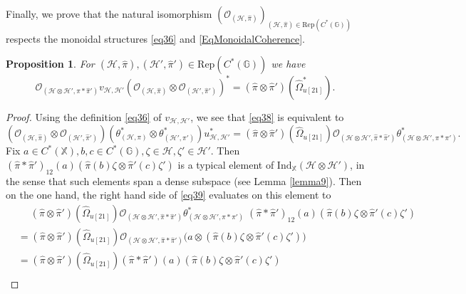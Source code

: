 \documentclass[reqno]{amsart}
\numberwithin{equation}{section}
\newtheorem{Prop}[Theorem]{Proposition}
\newcommand{\G}{\mathbb{G}}
\newcommand{\X}{\mathbb{X}}
\newcommand{\Rep}{\mathrm{Rep}}
\newcommand{\Ind}{\mathrm{Ind}}
\newcommand{\mc}{\mathcal}
\newcommand{\GG}{\mathbb{G}}
\begin{document}
Finally, we prove that the natural isomorphism $(\mc{O}_{(\mc{H},\hat{\pi})})_{(\mc{H},\hat{\pi})\in \Rep(C^*(\G))}$ respects the monoidal structures \eqref{eq36} and \eqref{EqMonoidalCoherence}.

\begin{Prop}\label{prop1}
For $(\mc{H},\hat{\pi}),(\mc{H}',\hat{\pi}')\in \Rep(C^*(\GG))$ we have
\begin{equation}\label{eq38}
\mc{O}_{(\mc{H}\otimes \mc{H}', \hat{\pi}\ast\hat{\pi}')} v_{\mc{H},\mc{H}'}
(\mc{O}_{(\mc{H}, \hat{\pi})}\otimes 
\mc{O}_{( \mc{H}', \hat{\pi}')})^*=
(\hat{\pi}\otimes\hat{\pi}')(\hat{\Omega}^*_{u [21]}).
\end{equation}
\end{Prop}

\begin{proof}
Using the definition \eqref{eq36} of $v_{\mc{H},\mc{H}'}$, we see that \eqref{eq38} is equivalent to
\begin{equation}\label{eq39}
(\mc{O}_{(\mc{H},\hat{\pi})}\otimes \mc{O}_{(\mc{H}',\hat{\pi}')})
( \theta_{(\mc{H},\pi)}^*\otimes \theta_{(\mc{H}',\pi')}^*) u_{\mc{H},\mc{H}'}^*  =
 (\hat{\pi}\otimes \hat{\pi}') (\hat{\Omega}_{u [21]})
 \mc{O}_{(\mc{H}\otimes\mc{H}',\hat{\pi}\ast \hat{\pi}')}
  \theta_{(\mc{H}\otimes \mc{H}',\pi\ast \pi')}^*.
\end{equation}
Fix $a\in C^*(\X),b,c\in C^*(\GG),\zeta\in \mc{H},\zeta'\in \mc{H}'$. Then
$(\hat{\pi}\ast\hat{\pi}')_{12}(a) (\hat{\pi}(b)\zeta \otimes \hat{\pi}'(c) \zeta')$ is a typical element of $\Ind_{\X}(\mc{H}\otimes \mc{H}')$, in the sense that such elements span a dense subspace (see Lemma \ref{lemma9}). Then on the one hand, the right hand side of \eqref{eq39} evaluates on this element to
\begin{equation}\begin{split} \label{eq40}
&\quad\;
 (\hat{\pi}\otimes \hat{\pi}') (\hat{\Omega}_{u [21]})
 \mc{O}_{(\mc{H}\otimes \mc{H}',\hat{\pi}\ast\hat{\pi}')}
  \theta_{(\mc{H}\otimes \mc{H}',\pi\ast \pi')}^*\;
(\hat{\pi}\ast\hat{\pi}')_{12}(a) (\hat{\pi}(b)\zeta \otimes \hat{\pi}'(c) \zeta')\\
&=
 (\hat{\pi}\otimes \hat{\pi}') (\hat{\Omega}_{u [21]})
 \mc{O}_{(\mc{H}\otimes \mc{H}',\hat{\pi}\ast\hat{\pi}')}
\bigl( 
a\otimes (\hat{\pi}(b)\zeta \otimes \hat{\pi}'(c) \zeta')\bigr)\\
&=
(\hat{\pi}\otimes\hat{\pi}')(\hat{\Omega}_{u[21]})
(\hat{\pi}\ast\hat{\pi}')(a)  (\hat{\pi}(b)\zeta \otimes \hat{\pi}'(c) \zeta')\\

\end{split}
\end{equation}
\end{proof}
\end{document}

